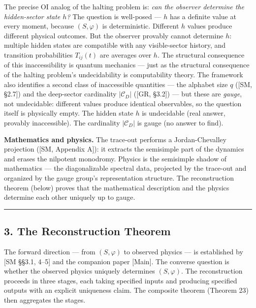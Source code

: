 \documentclass[
]{article}
\begin{document}
The precise OI analog of the halting problem is: \emph{can the observer
determine the hidden-sector state \(h\)?} The question is well-posed ---
\(h\) has a definite value at every moment, because \((S, \varphi)\) is
deterministic. Different \(h\) values produce different physical
outcomes. But the observer provably cannot determine \(h\): multiple
hidden states are compatible with any visible-sector history, and
transition probabilities \(T_{ij}(t)\) are averages over \(h\). The
structural consequence of this inaccessibility is quantum mechanics ---
just as the structural consequence of the halting problem's
undecidability is computability theory. The framework also identifies a
second class of inaccessible quantities --- the alphabet size \(q\)
({[}SM, §2.7{]}) and the deep-sector cardinality \(|\mathcal{C}_D|\)
({[}GR, §3.2{]}) --- but these are \emph{gauge}, not undecidable:
different values produce identical observables, so the question itself
is physically empty. The hidden state \(h\) is undecidable (real answer,
provably inaccessible). The cardinality \(|\mathcal{C}_D|\) is gauge (no
answer to find).

\textbf{Mathematics and physics.} The trace-out performs a
Jordan-Chevalley projection ({[}SM, Appendix A{]}): it extracts the
semisimple part of the dynamics and erases the nilpotent monodromy.
Physics is the semisimple shadow of mathematics --- the diagonalizable
spectral data, projected by the trace-out and organized by the gauge
group's representation structure. The reconstruction theorem (below)
proves that the mathematical description and the physics determine each
other uniquely up to gauge.

\begin{center}\rule{0.5\linewidth}{0.5pt}\end{center}

\hypertarget{the-reconstruction-theorem}{%
\subsection{3. The Reconstruction
Theorem}\label{the-reconstruction-theorem}}

The forward direction --- from \((S, \varphi)\) to observed physics ---
is established by {[}SM §§3.1, 4--5{]} and the companion paper
{[}Main{]}. The converse question is whether the observed physics
uniquely determines \((S, \varphi)\). The reconstruction proceeds in
three stages, each taking specified inputs and producing specified
outputs with an explicit uniqueness claim. The composite theorem
(Theorem 23) then aggregates the stages.
\end{document}
